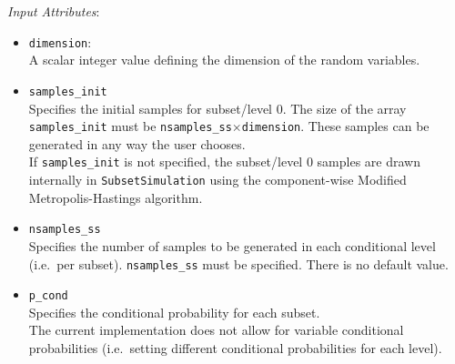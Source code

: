 \noindent\textit{Input Attributes}:
\begin{itemize}
\item \texttt{dimension}:\\ 
	A scalar integer value defining the dimension of the random variables. 
\item \texttt{samples\_init}\\
	Specifies the initial samples for subset/level 0. The size of the array \texttt{samples\_init} must be \texttt{nsamples\_ss}$\times$\texttt{dimension}. These samples can be generated in any way the user chooses.\\
    
    If \texttt{samples\_init} is not specified, the subset/level 0 samples are drawn internally in \texttt{SubsetSimulation} using the component-wise Modified Metropolis-Hastings algorithm.
\item \texttt{nsamples\_ss}\\
	Specifies the number of samples to be generated in each conditional level (i.e.\ per subset). \texttt{nsamples\_ss} must be specified. There is no default value.
\item \texttt{p\_cond}\\
	Specifies the conditional probability for each subset.\\
    
    The current implementation does not allow for variable conditional probabilities (i.e.\ setting different conditional probabilities for each level).\\
    

\end{itemize}
